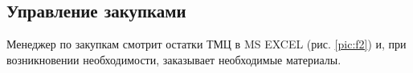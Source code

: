 \subsection{Управление закупками}

 Менеджер по закупкам смотрит остатки ТМЦ в MS EXCEL (рис. \ref{pic:f2}) и, при возникновении необходимости, заказывает необходимые материалы.


